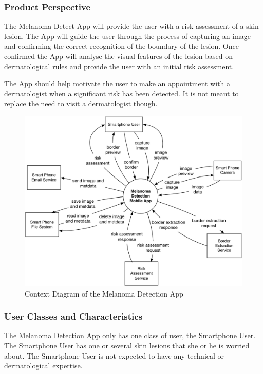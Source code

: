 
        \subsubsection{Product Perspective}

            The Melanoma Detect App will provide the user with a risk assessment of a skin lesion. The App will guide the user through the process of capturing an image and confirming the correct recognition of the boundary of the lesion. Once confirmed the App will analyse the visual features of the lesion based on dermatological rules and provide the user with an initial risk assessment.

    The App should help motivate the user to make an appointment with a dermatologist when a significant risk has been detected. It is not meant to replace the need to visit a dermatologist though.


            \begin{figure}[H]
                \centering
                \includegraphics[width=\textwidth]{assets/requirements/ContextDiagram.pdf}
                \caption{Context Diagram of the Melanoma Detection App}
                \label{fig:partial_feature_tree}
            \end{figure}


        \subsubsection{User Classes and Characteristics}

            The Melanoma Detection App only has one class of user, the Smartphone User. The Smartphone User has one or several skin lesions that she or he is worried about.
The Smartphone User is not expected to have any technical or dermatological expertise.

